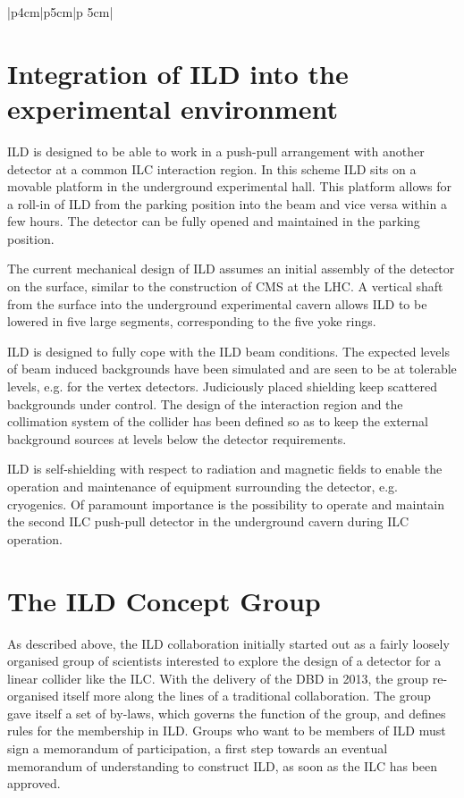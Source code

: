 \documentclass[%
 amsmath,amssymb,
 aps,
 longbibliography,
]{revtex4-1}
\begin{document}
\begin{table}[thb]
\begin{tabular}{|p{4cm}|p{5cm}|p {5cm}|}


    \end{tabular}
    \caption{Table of benchmark reactions which are used by ILD to optimize the detector performance. The analyses are mostly conducted at 500\,GeV center-of-mass energy, to optimally study the detector sensitivty. The channel, the physics motivation, and the main detector performance parameters are given.}
    \label{tab-benchmark}
\end{table}
\section{Integration of ILD into the experimental environment}
ILD is designed to be able to work in a push-pull arrangement with another detector at a common ILC interaction region. In this scheme ILD sits on a movable platform in the underground experimental hall. This platform allows for a roll-in of ILD from the parking position into the beam and vice versa within a few hours. The detector can be fully opened and maintained in the parking position.

The current mechanical design of ILD assumes an initial assembly of the detector on the surface, similar to the construction of CMS at the LHC. A vertical shaft from the surface into the underground experimental cavern allows ILD to be lowered in five large segments, corresponding to the five yoke rings.

ILD is designed to fully cope with the ILD beam conditions. The expected levels of beam induced backgrounds have been simulated and are seen to be at tolerable levels, { e.g.} for the vertex detectors. Judiciously placed shielding keep scattered backgrounds under control. The design of the interaction region and the collimation system of the collider has been defined so as to keep the external background sources at levels below the detector requirements.

ILD is self-shielding with respect to radiation and magnetic fields to enable the operation and maintenance of equipment surrounding the detector, {e.g.} cryogenics. Of paramount importance is the possibility to operate and maintain the second ILC push-pull detector in the underground cavern during ILC operation.

\section{The ILD Concept Group}
As described above, the ILD collaboration initially started out as a fairly loosely organised group of scientists interested to explore the design of a detector for a linear collider like the ILC. With the delivery of the DBD in 2013, the group re-organised itself more along the lines of a traditional collaboration. The group gave itself a set of by-laws, which governs the function of the group, and defines rules for the membership in ILD. Groups who want to be members of ILD must sign a memorandum of participation, a first step towards an eventual memorandum of understanding to construct ILD, as soon as the ILC has been approved. 
\end{document}
